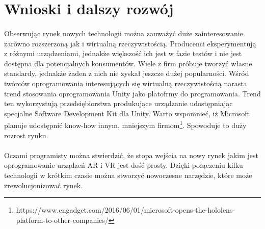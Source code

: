 \newpage
\section{Wnioski i dalszy rozwój}
\paragraph{}
Obserwując rynek nowych technologii można zauważyć duże zainteresowanie zarówno rozszerzoną jak i wirtualną rzeczywistością. Producenci eksperymentują z różnymi urządzeniami, jednakże większość ich jest w fazie testów i nie jest dostępna dla potencjalnych konsumentów.
Wiele z firm próbuje tworzyć własne standardy, jednakże żaden z nich nie zyskał jeszcze dużej popularności.
Wśród twórców oprogramowania interesujących się wirtualną rzeczywistością narasta trend stosowania oprogramowania Unity jako platofrmy do programowania. Trend ten wykorzystują przedsiębiorstwa produkujące urządzanie udostępniając specjalne Software Development Kit dla Unity. Warto wspomnieć, iż Microsoft planuje udostępnić know-how innym, mniejszym firmom\footnote{https://www.engadget.com/2016/06/01/microsoft-opens-the-hololens-platform-to-other-companies/}. Spowoduje to duży rozrost rynku.

\paragraph{}
Oczami programisty można stwierdzić, że stopa wejścia na nowy rynek jakim jest oprogramowanie urządzeń AR i VR jest dość prosty. Dzięki połączeniu kilku technologii w krótkim czasie można stworzyć nowoczesne narzędzie, które może zrewolucjonizować rynek.
